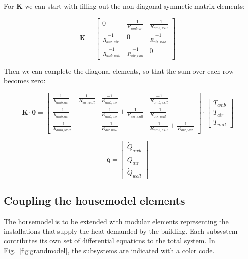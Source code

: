 For $\mathbf{K}$ we can start with filling out the non-diagonal symmetic matrix elements:

\begin{equation}
		\mathbf{K} =
	\begin{bmatrix}
		0  & \frac{-1}{R_{amb,air}} & \frac{-1}{R_{amb,wall}}  \\
		\frac{-1}{R_{amb, air}} &  0 &  \frac{-1}{R_{air,wall}} \\
		\frac{-1}{R_{amb,wall}} & \frac{-1}{R_{air, wall}}  & 0 
	\end{bmatrix}
\end{equation}

Then we can complete the diagonal elements, so that the sum over each row becomes zero:

\begin{equation}
	\mathbf{K} \cdot \boldsymbol{\theta} =
	\begin{bmatrix}
		\frac{1}{R_{amb, air}} + \frac{1}{R_{air,wall}}  & \frac{-1}{R_{amb,air}} & \frac{-1}{R_{amb,wall}}  \\
		\frac{-1}{R_{amb, air}} &  \frac{1}{R_{amb, air}} + \frac{1}{R_{air,wall}} &  \frac{-1}{R_{air,wall}} \\
		\frac{-1}{R_{amb,wall}} & \frac{-1}{R_{air, wall}}  & \frac{1}{R_{amb, wall}} + \frac{1}{R_{air,wall}} 
	\end{bmatrix}
	\cdot
	\begin{bmatrix}
		T_{amb} \\
		T_{air} \\
		T_{wall}
	\end{bmatrix}
\end{equation}

\begin{equation}
	\mathbf{\dot{q}} =
	\begin{bmatrix}
		\dot{Q}_{amb}\\
		\dot{Q}_{air} \\
		\dot{Q}_{wall} 
	\end{bmatrix}
\end{equation}

\subsection{Coupling the housemodel elements}

The housemodel is to be extended with modular elements representing the installations that supply the heat demanded by the building. Each subsystem contributes its own set of differential equations to the total system. In Fig.~\ref{fig:grandmodel}, the subsystems are indicated with a color code.
 
